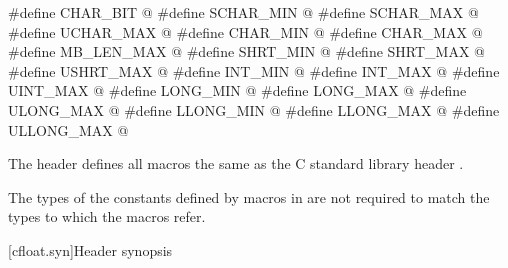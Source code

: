 %
%
%
%
%
%
%
%
%
%
%
%
%
%
%
%
%
%
%
\begin{codeblock}
#define CHAR_BIT @\seebelow@
#define SCHAR_MIN @\seebelow@
#define SCHAR_MAX @\seebelow@
#define UCHAR_MAX @\seebelow@
#define CHAR_MIN @\seebelow@
#define CHAR_MAX @\seebelow@
#define MB_LEN_MAX @\seebelow@
#define SHRT_MIN @\seebelow@
#define SHRT_MAX @\seebelow@
#define USHRT_MAX @\seebelow@
#define INT_MIN @\seebelow@
#define INT_MAX @\seebelow@
#define UINT_MAX @\seebelow@
#define LONG_MIN @\seebelow@
#define LONG_MAX @\seebelow@
#define ULONG_MAX @\seebelow@
#define LLONG_MIN @\seebelow@
#define LLONG_MAX @\seebelow@
#define ULLONG_MAX @\seebelow@
\end{codeblock}

\pnum
The header  defines all macros the same as
the C standard library header .
\begin{note}
The types of the constants defined by macros in  are not
required to match the types to which the macros refer.
\end{note}


[cfloat.syn]{Header  synopsis}

